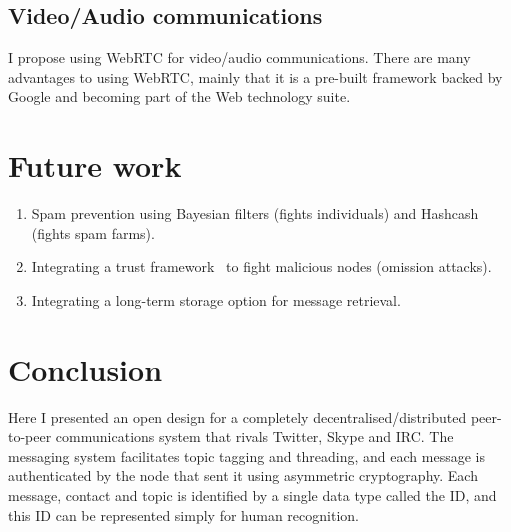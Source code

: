 \documentclass[10pt,a4paper,onecolumn]{article}
\begin{document}
\subsection*{Video/Audio communications}
I propose using WebRTC for video/audio communications. There are many advantages to using WebRTC, mainly that it is a pre-built framework backed by Google and becoming part of the Web technology suite. 




\section{Future work}
\begin{enumerate}
\item Spam prevention using Bayesian filters (fights individuals) and Hashcash (fights spam farms).
\item Integrating a trust framework~\cite{ham2005ara} to fight malicious nodes (omission attacks).
\item Integrating a long-term storage option for message retrieval.
\end{enumerate}

\section{Conclusion}
Here I presented an open design for a completely decentralised/distributed peer-to-peer communications system that rivals Twitter, Skype and IRC. The messaging system facilitates topic tagging and threading, and each message is authenticated by the node that sent it using asymmetric cryptography. Each message, contact and topic is identified by a single data type called the ID, and this ID can be represented simply for human recognition. 
\end{document}
